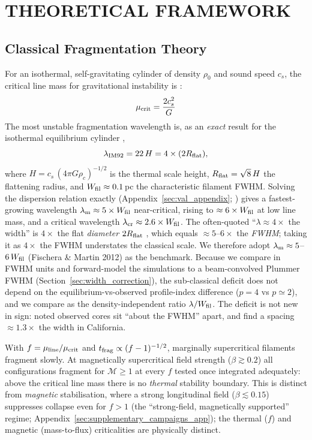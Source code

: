 \documentclass[usenatbib,twoside,twocolumn]{mnras}
\begin{document}
\section{THEORETICAL FRAMEWORK}
\label{sec:theory}

\subsection{Classical Fragmentation Theory}

For an isothermal, self-gravitating cylinder of density $\rho_0$ and sound speed $c_s$, the critical line mass for gravitational instability is \citep{Ostriker1964}:
\begin{equation}
\mu_{\rm crit} = \frac{2c_s^2}{G}
\end{equation}
The most unstable fragmentation wavelength is, as an \emph{exact} result for the isothermal equilibrium cylinder \citep{Inutsuka1992},
\begin{equation}
\lambda_{\rm IM92} = 22\,H = 4\times(2R_{\rm flat}),
\label{eq:im92}
\end{equation}
where $H = c_s\,(4\pi G\rho_c)^{-1/2}$ is the thermal scale height, $R_{\rm flat}=\sqrt8\,H$ the flattening radius, and $W_{\rm fil}\approx0.1$\,pc the characteristic filament FWHM. Solving the dispersion relation exactly (Appendix~\ref{sec:val_appendix}; \citealt{Fischera2012}) gives a fastest-growing wavelength $\lambda_{\rm m}\approx5\times W_{\rm fil}$ near-critical, rising to $\approx6\times W_{\rm fil}$ at low line mass, and a critical wavelength $\lambda_{\rm cr}\approx2.6\times W_{\rm fil}$. The often-quoted ``$\lambda\approx4\times$ the width'' is $4\times$ the flat \emph{diameter} $2R_{\rm flat}$ \citep{Inutsuka1992}, which equals $\approx5$--$6\times$ the \emph{FWHM}; taking it as $4\times$ the FWHM understates the classical scale. We therefore adopt $\lambda_{\rm m}\approx5$--$6\,W_{\rm fil}$ (Fischera \& Martin 2012) as the benchmark. Because we compare in FWHM units and forward-model the simulations to a beam-convolved Plummer FWHM (Section~\ref{sec:width_correction}), the sub-classical deficit does not depend on the equilibrium-vs-observed profile-index difference ($p=4$ vs $p\simeq2$), and we compare as the density-independent ratio $\lambda/W_{\rm fil}$. The deficit is not new in sign: \citet{Fischera2012} noted observed cores sit ``about the FWHM'' apart, and \citet{Zhang2023cal} find a spacing $\approx1.3\times$ the width in California.

With $f=\mu_{\rm line}/\mu_{\rm crit}$ and $t_{\rm frag}\propto(f-1)^{-1/2}$, marginally supercritical filaments fragment slowly. At magnetically supercritical field strength ($\beta\gtrsim0.2$) all configurations fragment for $\mathcal{M}\geq1$ at every $f$ tested once integrated adequately: above the critical line mass there is no \emph{thermal} stability boundary. This is distinct from \emph{magnetic} stabilisation, where a strong longitudinal field ($\beta\lesssim0.15$) suppresses collapse even for $f>1$ (the ``strong-field, magnetically supported'' regime; Appendix~\ref{sec:supplementary_campaigns_app}); the thermal ($f$) and magnetic (mass-to-flux) criticalities are physically distinct.
\end{document}
